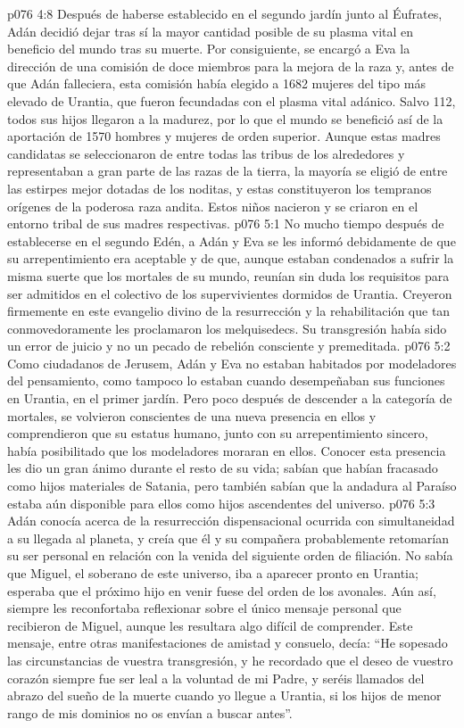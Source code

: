 \vs p076 4:8 \pc Después de haberse establecido en el segundo jardín junto al Éufrates, Adán decidió dejar tras sí la mayor cantidad posible de su plasma vital en beneficio del mundo tras su muerte. Por consiguiente, se encargó a Eva la dirección de una comisión de doce miembros para la mejora de la raza y, antes de que Adán falleciera, esta comisión había elegido a 1682 mujeres del tipo más elevado de Urantia, que fueron fecundadas con el plasma vital adánico. Salvo 112, todos sus hijos llegaron a la madurez, por lo que el mundo se benefició así de la aportación de 1570 hombres y mujeres de orden superior. Aunque estas madres candidatas se seleccionaron de entre todas las tribus de los alrededores y representaban a gran parte de las razas de la tierra, la mayoría se eligió de entre las estirpes mejor dotadas de los noditas, y estas constituyeron los tempranos orígenes de la poderosa raza andita. Estos niños nacieron y se criaron en el entorno tribal de sus madres respectivas.
\vs p076 5:1 No mucho tiempo después de establecerse en el segundo Edén, a Adán y Eva se les informó debidamente de que su arrepentimiento era aceptable y de que, aunque estaban condenados a sufrir la misma suerte que los mortales de su mundo, reunían sin duda los requisitos para ser admitidos en el colectivo de los supervivientes dormidos de Urantia. Creyeron firmemente en este evangelio divino de la resurrección y la rehabilitación que tan conmovedoramente les proclamaron los melquisedecs. Su transgresión había sido un error de juicio y no un pecado de rebelión consciente y premeditada.
\vs p076 5:2 Como ciudadanos de Jerusem, Adán y Eva no estaban habitados por modeladores del pensamiento, como tampoco lo estaban cuando desempeñaban sus funciones en Urantia, en el primer jardín. Pero poco después de descender a la categoría de mortales, se volvieron conscientes de una nueva presencia en ellos y comprendieron que su estatus humano, junto con su arrepentimiento sincero, había posibilitado que los modeladores moraran en ellos. Conocer esta presencia les dio un gran ánimo durante el resto de su vida; sabían que habían fracasado como hijos materiales de Satania, pero también sabían que la andadura al Paraíso estaba aún disponible para ellos como hijos ascendentes del universo.
\vs p076 5:3 \pc Adán conocía acerca de la resurrección dispensacional ocurrida con simultaneidad a su llegada al planeta, y creía que él y su compañera probablemente retomarían su ser personal en relación con la venida del siguiente orden de filiación. No sabía que Miguel, el soberano de este universo, iba a aparecer pronto en Urantia; esperaba que el próximo hijo en venir fuese del orden de los avonales. Aún así, siempre les reconfortaba reflexionar sobre el único mensaje personal que recibieron de Miguel, aunque les resultara algo difícil de comprender. Este mensaje, entre otras manifestaciones de amistad y consuelo, decía: “He sopesado las circunstancias de vuestra transgresión, y he recordado que el deseo de vuestro corazón siempre fue ser leal a la voluntad de mi Padre, y seréis llamados del abrazo del sueño de la muerte cuando yo llegue a Urantia, si los hijos de menor rango de mis dominios no os envían a buscar antes”.
